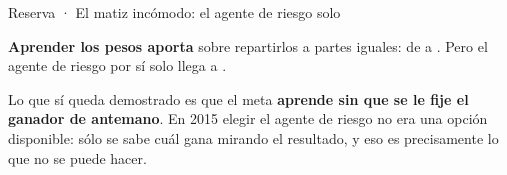 \documentclass[aspectratio=169,11pt]{beamer}
\begin{document}
{

\begin{frame}{Reserva · El matiz incómodo: el agente de riesgo solo}
  \vspace{0.55cm}
  \begin{center}
  \end{center}
  \vspace{0.65cm}
  {\small\hspace*{0.1cm}\textbf{Aprender los pesos aporta} sobre repartirlos a partes iguales:
  de \RankICEquiponderado{} a \RankICSeleccion{}. Pero el agente de riesgo por sí solo llega a
  \RankICRisk{}.}
  \par\medskip
  {\small\hspace*{0.1cm}Lo que sí queda demostrado es que el meta \textbf{aprende sin que se le fije
  el ganador de antemano}. En 2015 elegir el agente de riesgo no era una opción disponible: sólo se
  sabe cuál gana mirando el resultado, y eso es precisamente lo que no se puede hacer.}
\end{frame}

}
\end{document}
